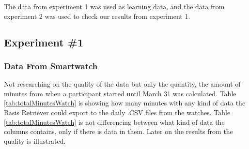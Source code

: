 \documentclass[12pt]{article} %
\begin{document}
The data from experiment 1 was used as learning data, and the data from experiment 2 was used to check our results from experiment 1. 

\subsection{Experiment \#1}
\subsubsection{Data From Smartwatch}
Not researching on the quality of the data but only the quantity, the amount of minutes from when a participant started until March 31 was calculated. Table \ref{tab:totalMinutesWatch} is showing how many minutes with any kind of data the Basis Retriever could export to the daily .CSV files from the watches. Table \ref{tab:totalMinutesWatch} is not differencing between what kind of data the columns contains, only if there is data in them. Later on the results from the quality is illustrated. 
\end{document}
